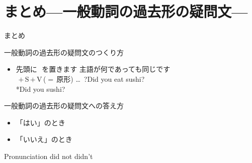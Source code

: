 \documentclass[aspectratio=169,xcolor={dvipsnames,table}]{beamer}
\begin{document}
\section{まとめ---一般動詞の過去形の疑問文---}
\begin{frame}[plain]{まとめ}
 

\begin{exampleblock}{一般動詞の過去形の疑問文のつくり方}\small
\begin{itemize}[square]
 \item   先頭に\,\,\,\,を置きます%
\hfill{\scriptsize 主語が何であっても同じです}\\[10pt]
	 \,\,$+$\,S\,$+$\,V\,{\scriptsize ($=$\,原形)} \ldots\,\,\,?\hfill{}Did you eat sushi?\\
\hfill{}*Did you  sushi?
\end{itemize}
     \end{exampleblock}

\pause

\begin{exampleblock}{一般動詞の過去形の疑問文への答え方}
\small
\begin{itemize}[square]
 \item 「はい」のとき\hfill{}\hspace{120pt}\mbox{}
 \item 「いいえ」のとき\hfill{}\hspace{120pt}\mbox{}
\end{itemize}
      \end{exampleblock}

\pause

\begin{exampleblock}{Pronunciation}
 \mbox{}\hfill{}did 
\hspace{25pt}not 
\hspace{25pt}didn't \hfill{}\mbox{}
\end{exampleblock}
\end{frame}
\end{document}
